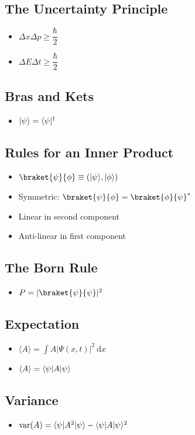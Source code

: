 \documentclass[]{report}
\DeclarePairedDelimiter\bra{\langle}{\rvert}
\DeclarePairedDelimiter\ket{\lvert}{\rangle}
\newcommand \tab[1][1cm]{\hspace*{#1}}
\newcommand{\dn}[1]{\ \mathrm{d}#1}
\newcommand{\itemt}{\item \tab}
\begin{document}
\subsection{The Uncertainty Principle}
\begin{itemize}
\item \( \Delta x \Delta p \geq \dfrac{\hbar}{2} \)
\item \( \Delta E \Delta t \geq \dfrac{\hbar}{2} \)
\end{itemize}

\subsection{Bras and Kets}			
\begin{itemize}
\itemt \( \ket{\psi} = \bra{\psi}^\dagger \)
\end{itemize}				

\subsection{Rules for an Inner Product}			

\begin{itemize}
\itemt \( \braket{\psi}{\phi} \equiv (\ket{\psi}, \ket{\phi}) \)
\item Symmetric:
\subitem \( \braket{\psi}{\phi} = \braket{\phi}{\psi}^* \)
\item Linear in second component
\item Anti-linear in first component
\end{itemize}				

\subsection{The Born Rule}
\begin{itemize}
\itemt \( P = |\braket{\psi}{\psi}|^2 \)
\end{itemize}

\subsection{Expectation}
\begin{itemize}
\itemt \( \langle A \rangle = \int A |\Psi(x,t)|^2 \dn x \)
\itemt \( \langle A \rangle = \bra{\psi} A \ket{\psi} \)
\end{itemize}	

\subsection{Variance}
\begin{itemize}
\itemt \( \mathrm{var}(A) = \bra{\psi} A^2 \ket{\psi} - \bra{\psi} A \ket{\psi}^2 \)
\end{itemize}	
\end{document}
